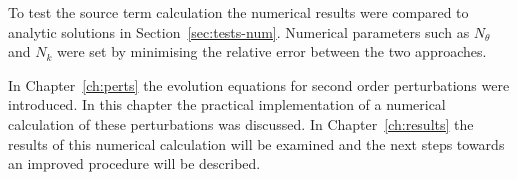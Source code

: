 To test the source term calculation the numerical results were compared to 
analytic solutions in Section~\ref{sec:tests-num}. Numerical parameters such as
$N_\theta$ and $N_k$ were set by minimising the relative error between the two
approaches.

In Chapter~\ref{ch:perts} the evolution equations for second order perturbations
were introduced. In this chapter the practical implementation of a numerical
calculation of these perturbations was discussed. In Chapter~\ref{ch:results} the
results of this numerical calculation will be examined and the next steps towards an
improved procedure will be described.